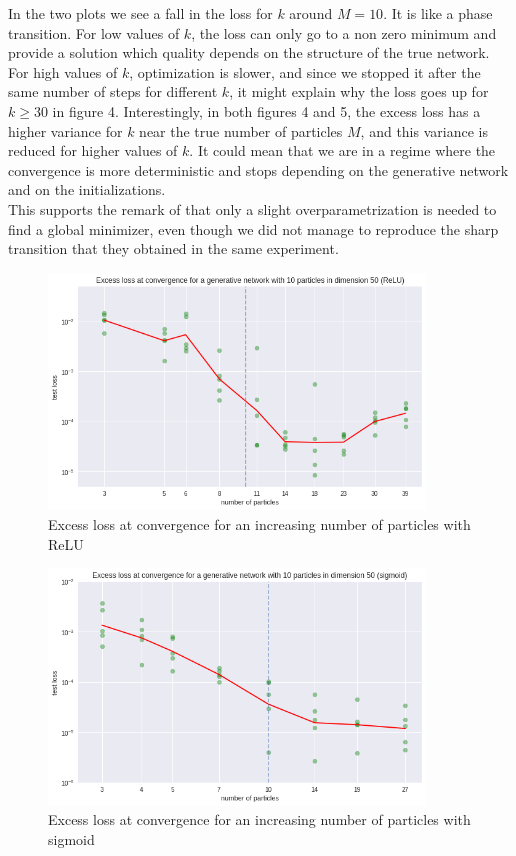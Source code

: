 \documentclass[a4paper, 11pt]{scrartcl}
\begin{document}
{In the two plots we see a fall in the loss for $k$ around $M=10$. It is like a phase transition. For low values of $k$, the loss can only go to a non zero minimum and provide a solution which quality depends on the structure of the true network. For high values of $k$, optimization is slower, and since we stopped it after the same number of steps for different $k$, it might explain why the loss goes up for $k \geq 30$ in figure 4. Interestingly, in both figures 4 and 5, the excess loss has a higher variance for $k$ near the true number of particles $M$, and this variance is reduced for higher values of $k$. It could mean that we are in a regime where the convergence is more deterministic and stops depending on the generative network and on the initializations.\\

This supports the remark of \cite{chizat2018global} that only a slight overparametrization is needed to find a global minimizer, even though we did not manage to reproduce the sharp transition that they obtained in the same experiment.




\begin{figure}[H]
\centering
\includegraphics[width=10cm]{lossr.png}
  \caption{Excess loss at convergence for an increasing number of particles with ReLU}
  \label{fig:3}
\end{figure}

\begin{figure}[H]
\centering
\includegraphics[width=10cm]{loss.png}
  \caption{Excess loss at convergence for an increasing number of particles with sigmoid}
  \label{fig:3}
\end{figure}


}
\end{document}
